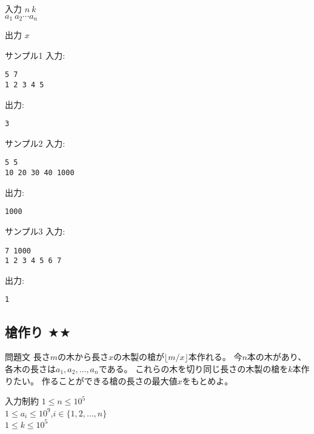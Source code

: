 \documentclass[a4paper,twoside,onecolumn,openany,article,10pt]{memoir}
\theoremstyle{remark}
\begin{document}
\begin{itembox}[l]{入力}
$n~k$\\
$a_1~a_2 \dotsb a_n$
\end{itembox}

\begin{itembox}[l]{出力}
$x$
\end{itembox}

\begin{itembox}[l]{サンプル1}
入力:
\begin{verbatim}
5 7
1 2 3 4 5
\end{verbatim}
出力:
\begin{verbatim}
3
\end{verbatim}
\end{itembox}

\begin{itembox}[l]{サンプル2}
入力:
\begin{verbatim}
5 5
10 20 30 40 1000
\end{verbatim}
出力:
\begin{verbatim}
1000
\end{verbatim}
\end{itembox}

\begin{itembox}[l]{サンプル3}
入力:
\begin{verbatim}
7 1000
1 2 3 4 5 6 7
\end{verbatim}
出力:
\begin{verbatim}
1
\end{verbatim}
\end{itembox}


\clearpage
\subsection{槍作り $\bigstar\bigstar$}
\begin{itembox}[l]{問題文}
長さ$m$の木から長さ$x$の木製の槍が$\lfloor m/x\rfloor$本作れる。
今$n$本の木があり、各木の長さは$a_1,a_2,\dotsc,a_n$である。
これらの木を切り同じ長さの木製の槍を$k$本作りたい。
作ることができる槍の長さの最大値$x$をもとめよ。
\end{itembox}

\begin{itembox}[l]{入力制約}
$1\le n\le 10^5$\\
$1\le a_i\le 10^9$,\hspace{2em}$i\in\{1,2,\dotsc,n\}$\\
$1\le k\le 10^5$
\end{itembox}
\end{document}
